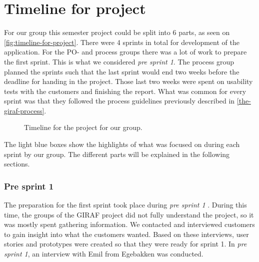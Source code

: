 \section{Timeline for project}
For our group this semester project could be split into 6 parts, as seen on \autoref{fig:timeline-for-project}.
There were 4 sprints in total for development of the application. 
For the PO- and process groups there was a lot of work to prepare the first sprint.
This is what we considered \textit{pre sprint 1}.
The process group planned the sprints such that the last sprint would end two weeks before the deadline for handing in the project.
Those last two weeks were spent on usability tests with the customers and finishing the report.
What was common for every sprint was that they followed the process guidelines previously described in \autoref{the-giraf-process}.

\begin{figure}[H]
    \caption{\label{fig:timeline-for-project} Timeline for the project for our group.}
\end{figure}

\noindent The light blue boxes show the highlights of what was focused on during each sprint by our group.
The different parts will be explained in the following sections.

\subsubsection{Pre sprint 1}
The preparation for the first sprint took place during \textit{pre sprint 1} .
During this time, the groups of the GIRAF project did not fully understand the project, so it was mostly spent gathering information.
We contacted and interviewed customers to gain insight into what the customers wanted.
Based on these interviews, user stories and prototypes were created so that they were ready for sprint 1.
In \textit{pre sprint 1}, an interview with Emil from Egebakken was conducted. 

